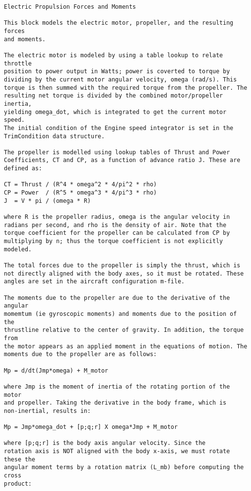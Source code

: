 \documentclass[12pt]{article}
\begin{document}
\begin{verbatim}
Electric Propulsion Forces and Moments

This block models the electric motor, propeller, and the resulting forces
and moments. 

The electric motor is modeled by using a table lookup to relate throttle
position to power output in Watts; power is coverted to torque by
dividing by the current motor angular velocity, omega (rad/s). This
torque is then summed with the required torque from the propeller. The
resulting net torque is divided by the combined motor/propeller inertia,
yielding omega_dot, which is integrated to get the current motor speed.
The initial condition of the Engine speed integrator is set in the
TrimCondition data structure.

The propeller is modelled using lookup tables of Thrust and Power
Coefficients, CT and CP, as a function of advance ratio J. These are
defined as:

CT = Thrust / (R^4 * omega^2 * 4/pi^2 * rho) 
CP = Power  / (R^5 * omega^3 * 4/pi^3 * rho) 
J  = V * pi / (omega * R)

where R is the propeller radius, omega is the angular velocity in
radians per second, and rho is the density of air. Note that the
torque coefficient for the propeller can be calculated from CP by
multiplying by n; thus the torque coefficient is not explicitly modeled.

The total forces due to the propeller is simply the thrust, which is 
not directly aligned with the body axes, so it must be rotated. These 
angles are set in the aircraft configuration m-file.

The moments due to the propeller are due to the derivative of the angular
momemtum (ie gyroscopic moments) and moments due to the position of the
thrustline relative to the center of gravity. In addition, the torque from
the motor appears as an applied moment in the equations of motion. The 
moments due to the propeller are as follows:

Mp = d/dt(Jmp*omega) + M_motor

where Jmp is the moment of inertia of the rotating portion of the motor
and propeller. Taking the derivative in the body frame, which is
non-inertial, results in:

Mp = Jmp*omega_dot + [p;q;r] X omega*Jmp + M_motor

where [p;q;r] is the body axis angular velocity. Since the
rotation axis is NOT aligned with the body x-axis, we must rotate these the
angular moment terms by a rotation matrix (L_mb) before computing the cross 
product:


\end{verbatim}
\end{document}
